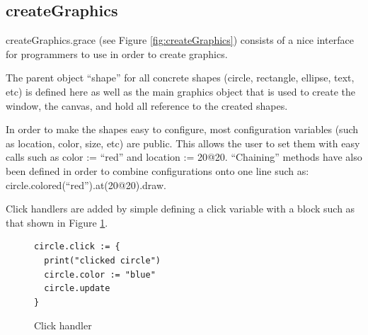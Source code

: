 \documentclass{article}
\begin{document}
\subsection{createGraphics}
createGraphics.grace (see Figure \ref{fig:createGraphics}) consists of a nice interface for
programmers to use in order to create graphics. 

The parent object ``shape'' for all concrete shapes (circle, rectangle, ellipse, text, etc) is
defined here as well as the main graphics object that is used to create the window, the
canvas, and hold all reference to the created shapes.

In order to make the shapes easy to configure, most configuration variables (such as location,
color, size, etc) are public. This allows the user to set them with easy calls such as
color := ``red'' and location := 20@20. ``Chaining'' methods have also been defined in order
to combine configurations onto one line such as: circle.colored(``red'').at(20@20).draw.

Click handlers are added by simple defining a click variable with a block such as that shown 
in Figure \ref{fig:click}.
\begin{figure}[h]
\begin{lstlisting}
circle.click := { 
  print("clicked circle") 
  circle.color := "blue"
  circle.update
}
\end{lstlisting}
\caption{Click handler}
\label{fig:click}
\end{figure}
\end{document}
